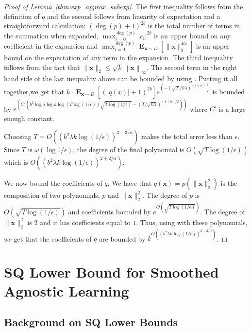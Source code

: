 \documentclass[10pt,a4paper]{article}
\newcommand\twonorm[1]{\|#1\|_2}
\newcommand\norm[1]{\left\| #1 \right\|}
\renewcommand\vec[1]{\mathbf{#1}}
\DeclareMathOperator*{\E}{\mathbf{E}}
\newcommand{\1}{\Ind}
\newcommand{\x}{\vec x}
\begin{document}
\begin{proof}[Proof of Lemma~\ref{thm:exp_approx_subexp}]
     The first inequality follows from the definition of $q$ and the second follows from linearity of expectation and a straightforward calculation: $(\deg(p)+1)^{2b}$ is the total number of terms in the summation when expanded, $\max_{i=0}^{\deg(p)}|c_i|^{2b}$ is an upper bound on any coefficient in the expansion and $\max_{i=0}^{\deg(p)}\E_{\x\sim D}[\twonorm{\x}^{4bi}]$ is an upper bound on the expectation of any term in the expansion. The third inequality follows from the fact that $\twonorm{\x}\leq \sqrt{k}\norm{\x}_{\infty}$. The second term in the right hand side of the last inequality above can be bounded by using . Putting it all together,we get that  $k\cdot\E_{\x\sim D}\left[(|q(x)|+1)^{2b}\right] e^{\left(-(\sqrt{T}/k\lambda)^{(1+\alpha)}\right)}$ is bounded by 
     $e^{\left(C'\left(b^2 \log \lambda\log k \log\left(T\log(1/\epsilon)\right)\sqrt{T\log(1/\epsilon)}-(T/\sqrt{k\lambda})^{(1+\alpha)/2}\right)\right)}$ where $C'$ is a large enough constant.     

     Choosing $T=O\left(\left(b^2\lambda k\log(1/\epsilon)\right)^{3+3/\alpha}\right)$ makes the total error less than $\epsilon$. Since $T$ is $\omega(\log 1/\epsilon)$, the degree of the final polynomial is $O(\sqrt{T\log(1/\epsilon)})$ which is $O\left( (b^2\lambda k\log(1/\epsilon))^{2+2/\alpha} \right)$.

     We now bound the coefficients of $q$. We have that $q(\x)=p(\twonorm{\x}^2)$ is the composition of two polynomials, $p$ and $\twonorm{\x}^2$. The degree of $p$ is $O(\sqrt{T\log (1/\epsilon)})$ and coefficients bounded by $e^{O\left(\sqrt{T\log(1/\epsilon)}\right)}$. The degree of $\twonorm{\x}^2$ is $2$ and it has coefficients equal to $1$. Thus, using  with these polynomials, we get that the coefficients of $q$ are bounded by $k^{O\left( (b^{2}\lambda k\log(1/\epsilon))^{2+2/\alpha} \right)}$.
\end{proof}
    
\section{SQ Lower Bound for Smoothed Agnostic Learning}





\subsection{Background on SQ Lower Bounds}
\label{ssec:SQ-prelims}
\end{document}
